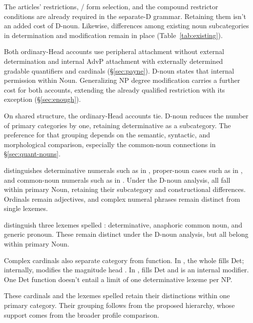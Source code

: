 \documentclass[12pt]{article}
\begin{document}
The articles' restrictions, / form selection, and the compound restrictor conditions are already required in the separate-D grammar. Retaining them isn't an added cost of D-noun. Likewise, differences among existing noun subcategories in determination and modification remain in place (Table~\ref{tab:existing}).

Both ordinary-Head accounts use peripheral attachment without external determination and internal AdvP attachment with externally determined gradable quantifiers and cardinals (§\ref{sec:payne}). D-noun states that internal permission within Noun. Generalizing NP degree modification carries a further cost for both accounts, extending the already qualified restriction with its  exception (§\ref{sec:enough}).

On shared structure, the ordinary-Head accounts tie. D-noun reduces the number of primary categories by one, retaining determinative as a subcategory. The preference for that grouping depends on the semantic, syntactic, and morphological comparison, especially the common-noun connections in §\ref{sec:quant-nouns}.

\textcite{reynolds2026numerals} distinguishes determinative numerals such as  in , proper-noun cases such as  in , and common-noun numerals such as  in . Under the D-noun analysis, all fall within primary Noun, retaining their subcategory and constructional differences. Ordinals remain adjectives, and complex numeral phrases remain distinct from single lexemes.

\textcite[797--798]{payne2013anaphoric} distinguish three lexemes spelled : determinative, anaphoric common noun, and generic pronoun. These remain distinct under the D-noun analysis, but all belong within primary Noun.

Complex cardinals also separate category from function. In , the whole  fills Det; internally,  modifies the magnitude head  \citep[§4]{reynolds2026numerals}. In ,  fills Det and  is an internal modifier. One Det function doesn't entail a limit of one determinative lexeme per NP.

These cardinals and the lexemes spelled  retain their distinctions within one primary category. Their grouping follows from the proposed hierarchy, whose support comes from the broader profile comparison.
\end{document}
